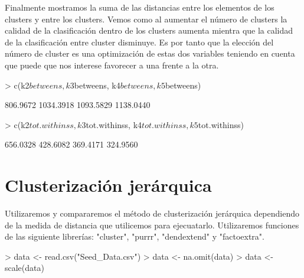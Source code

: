 \documentclass [a4paper] {article}
\begin{document}
Finalmente mostramos la suma de las distancias entre los elementos de los clusters y entre los clusters.
Vemos como al aumentar el número de clusters la calidad de la clasificación dentro de los clusters aumenta mientra que la calidad de la clasificación entre cluster disminuye.
Es por tanto que la elección del número de cluster es una optimización de estas dos variables teniendo en cuenta que puede que nos interese favorecer a una frente a la otra.
\begin{Schunk}
\begin{Sinput}
> c(k2$betweens, k3$betweens, k4$betweens, k5$betweens)
\end{Sinput}
\begin{Soutput}
[1]  806.9672 1034.3918 1093.5829 1138.0440
\end{Soutput}
\begin{Sinput}
> c(k2$tot.withinss, k3$tot.withinss, k4$tot.withinss, k5$tot.withinss)
\end{Sinput}
\begin{Soutput}
[1] 656.0328 428.6082 369.4171 324.9560
\end{Soutput}
\end{Schunk}

\newpage
\section{Clusterización jerárquica}
Utilizaremos y compararemos el método de clusterización jerárquica dependiendo de la medida de distancia que utilicemos para ejecuatarlo.
Utilizaremos funciones de las siguiente librerías: "cluster", "purrr", "dendextend" y "factoextra".

\begin{Schunk}
\begin{Sinput}
> data <- read.csv("Seed_Data.csv")
> data <- na.omit(data)
> data <- scale(data)
\end{Sinput}
\end{Schunk}
\end{document}
